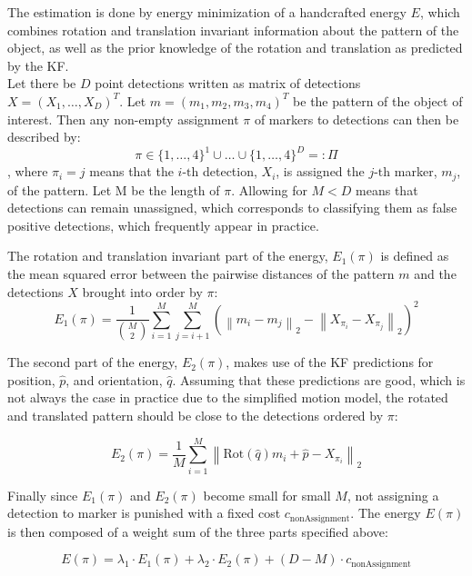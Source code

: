 \documentclass[12pt,a4paper]{article}
\begin{document}
The estimation is done by energy minimization of a handcrafted energy $E$, which combines rotation and translation invariant information about the pattern of the object, as well as the prior knowledge of the rotation and translation as predicted by the KF. \\
Let there be $D$ point detections written as matrix of detections $X=(X_1, \dots, X_D)^T$. Let $m=(m_1, m_2, m_3, m_4)^T$ be the pattern of the object of interest.
Then any non-empty assignment $\pi$ of markers to detections can then be described by:
\begin{equation}
	\pi \in  \{1, \dots, 4\}^1 \cup \dots \cup \{1, \dots, 4 \}^D =: \Pi
\end{equation}, where $\pi_i = j$ means that the $i\text{-th}$ detection, $X_i$, is assigned the $j\text{-th}$ marker, $m_j$, of the pattern. Let M be the length of $\pi$. Allowing for $M<D$ means that detections can remain unassigned, which corresponds to classifying them as false positive detections, which frequently appear in practice.

The rotation and translation invariant part of the energy, $E_1(\pi)$ is defined as the mean squared error between the pairwise distances of the pattern  $m$ and the detections  $X$ brought into order by $\pi$:
\begin{equation}
	E_1(\pi) =  \frac{1}{\binom{M}{2}}\sum_{i =1}^M\sum_{j =i+1}^M \left( \left\| m_i - m_j\right\|_2 - \left\| X_{\pi_i} - X_{\pi_j}\right\|_2 \right)^2
\end{equation}

The second part of the energy, $E_2(\pi)$, makes use of the KF predictions  for position, $\hat{p}$,  and orientation, $\hat{q}$. Assuming that these predictions are good, which is not always the case in practice due to the simplified motion model, the rotated and translated pattern should be close to the detections ordered by $\pi$:

\begin{equation}
	E_2(\pi) = \frac{1}{M}\sum_{i =1}^M \left\| \text{Rot}(\hat{q})m_i + \hat{p}- X_{\pi_i}\right\|_2 
\end{equation}

Finally since $E_1(\pi)$ and $E_2(\pi) $ become small for small $M$, not assigning a detection to marker is punished with a fixed cost $c_{\text{nonAssignment}}$. The energy $E(\pi)$ is then composed of a weight sum of the three parts specified above:

\begin{equation}
	E(\pi) = \lambda_1 \cdot E_1(\pi) + \lambda_2 \cdot E_2(\pi) + (D-M) \cdot c_{\text{nonAssignment}}
\end{equation}
\end{document}
